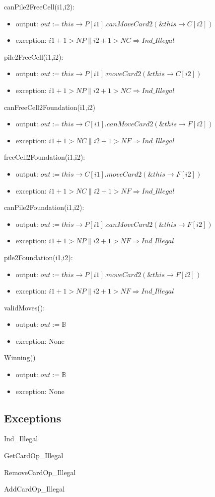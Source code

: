 \documentclass[12pt]{article}
\begin{document}
\noindent canPile2FreeCell(i1,i2):
\begin{itemize}
\item output: $out :=  this\rightarrow P[i1].canMoveCard2(\& this \rightarrow C[i2])$
\item exception: $i1+1>NP \| i2+1>NC \Rightarrow Ind\_Illegal$
\end{itemize}

\noindent pile2FreeCell(i1,i2):
\begin{itemize}
\item output: $out :=  this\rightarrow P[i1].moveCard2(\& this \rightarrow C[i2])$
\item exception: $i1+1>NP \| i2+1>NC \Rightarrow Ind\_Illegal$
\end{itemize}

\noindent canFreeCell2Foundation(i1,i2)
\begin{itemize}
\item output: $out :=  this\rightarrow C[i1].canMoveCard2(\& this \rightarrow F[i2])$
\item exception: $i1+1>NC \| i2+1>NF \Rightarrow Ind\_Illegal$
\end{itemize}

\noindent freeCell2Foundation(i1,i2):
\begin{itemize}
\item output: $out :=  this\rightarrow C[i1].moveCard2(\& this \rightarrow F[i2])$
\item exception: $i1+1>NC \| i2+1>NF \Rightarrow Ind\_Illegal$
\end{itemize}

\noindent canPile2Foundation(i1,i2):
\begin{itemize}
\item output: $out :=  this\rightarrow P[i1].canMoveCard2(\& this \rightarrow F[i2])$
\item exception: $i1+1>NP \| i2+1>NF \Rightarrow Ind\_Illegal$
\end{itemize}

\noindent pile2Foundation(i1,i2):
\begin{itemize}
\item output: $out :=  this\rightarrow P[i1].moveCard2(\& this \rightarrow F[i2])$
\item exception: $i1+1>NP \| i2+1>NF \Rightarrow Ind\_Illegal$
\end{itemize}

\noindent validMoves():
\begin{itemize}
\item output: $out :=  \mathbb{B}$
\item exception: None
\end{itemize}

\noindent Winning()
\begin{itemize}
\item output: $out :=  \mathbb{B}$
\item exception: None
\end{itemize}


\subsection*{Exceptions}

\noindent Ind\_Illegal

\noindent GetCardOp\_Illegal

\noindent RemoveCardOp\_Illegal

\noindent AddCardOp\_Illegal

\newpage
\end{document}
